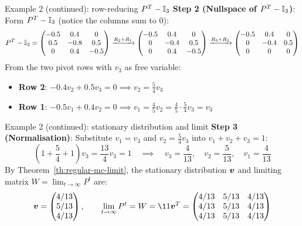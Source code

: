\documentclass[aspectratio=169]{beamer}\usepackage[]{graphicx}\usepackage[]{xcolor}
\begin{document}
\begin{frame}{Example 2 (continued): row-reducing $P^T - \mathbb{I}_3$}
\textbf{Step 2 (Nullspace of $P^T - \mathbb{I}_3$)}: Form $P^T - \mathbb{I}_3$ (notice the columns sum to $0$):
{\footnotesize
\[
P^T - \mathbb{I}_3 = \begin{pmatrix}
-0.5 & 0.4 & 0 \\
0.5 & -0.8 & 0.5 \\
0 & 0.4 & -0.5
\end{pmatrix}
\xrightarrow{R_2 + R_1}
\begin{pmatrix}
-0.5 & 0.4 & 0 \\
0 & -0.4 & 0.5 \\
0 & 0.4 & -0.5
\end{pmatrix}
\xrightarrow{R_3 + R_2}
\begin{pmatrix}
-0.5 & 0.4 & 0 \\
0 & -0.4 & 0.5 \\
0 & 0 & 0
\end{pmatrix}
\]
}
\vfill
From the two pivot rows with $v_3$ as free variable:
\begin{itemize}
\item \textbf{Row 2}: $-0.4 v_2 + 0.5 v_3 = 0 \implies v_2 = \frac{5}{4} v_3$
\item \textbf{Row 1}: $-0.5 v_1 + 0.4 v_2 = 0 \implies v_1 = \frac{4}{5} v_2 = \frac{4}{5} \cdot \frac{5}{4} v_3 = v_3$
\end{itemize}
\end{frame}

\begin{frame}{Example 2 (continued): stationary distribution and limit}
\textbf{Step 3 (Normalisation)}: Substitute $v_1 = v_3$ and $v_2 = \frac{5}{4} v_3$ into $v_1 + v_2 + v_3 = 1$:
\[
\left(1 + \frac{5}{4} + 1\right) v_3 = \frac{13}{4} v_3 = 1 \quad \implies \quad v_3 = \frac{4}{13}, \quad v_2 = \frac{5}{13}, \quad v_1 = \frac{4}{13}
\]
\vfill
By Theorem~\ref{th:regular-mc-limit}, the stationary distribution $\bm{v}$ and limiting matrix $W = \lim_{t \to \infty} P^t$ are:
\[
\bv = \begin{pmatrix} 4/13 \\ 5/13 \\ 4/13 \end{pmatrix},
\qquad
\lim_{t \to \infty} P^t = W = \11\bv^T = \begin{pmatrix}
4/13 & 5/13 & 4/13 \\
4/13 & 5/13 & 4/13 \\
4/13 & 5/13 & 4/13
\end{pmatrix}
\]
\end{frame}
\end{document}
